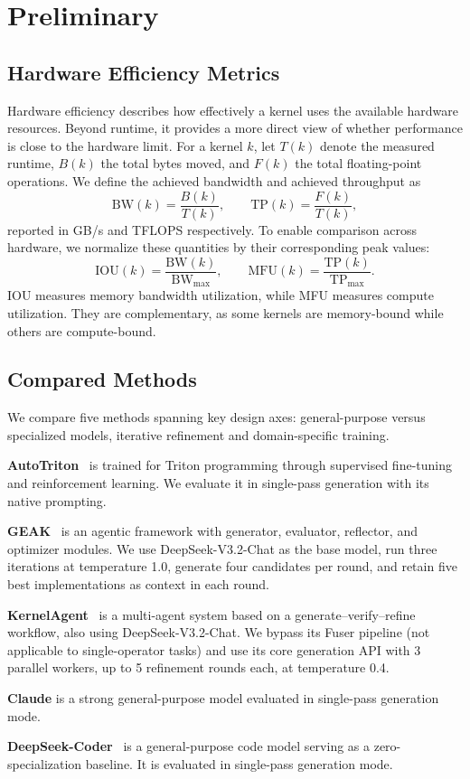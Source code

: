 \section{Preliminary}  
\label{Sec:Preliminary}

\subsection{Hardware Efficiency Metrics}

Hardware efficiency describes how effectively a kernel uses the available hardware resources. Beyond runtime, it provides a more direct view of whether performance is close to the hardware limit.
For a kernel $k$, let $T(k)$ denote the measured runtime, $B(k)$ the total bytes moved, and $F(k)$ the total floating-point operations. We define the achieved bandwidth and achieved throughput as
\begin{equation}
\mathrm{BW}(k)=\frac{B(k)}{T(k)}, \qquad
\mathrm{TP}(k)=\frac{F(k)}{T(k)},
\end{equation}
reported in GB/s and TFLOPS respectively.
To enable comparison across hardware, we normalize these quantities by their corresponding peak values:
\begin{equation}
\mathrm{IOU}(k)=\frac{\mathrm{BW}(k)}{\mathrm{BW}_{\max}}, \qquad
\mathrm{MFU}(k)=\frac{\mathrm{TP}(k)}{\mathrm{TP}_{\max}}.
\end{equation}
IOU measures memory bandwidth utilization, while MFU measures compute utilization. They are complementary, as some kernels are memory-bound while others are compute-bound.


\subsection{Compared Methods}

We compare five methods spanning key design axes: general-purpose versus specialized models, iterative refinement and domain-specific training.

\textbf{AutoTriton}~\cite{li2025autotriton} is trained for Triton programming through supervised fine-tuning and reinforcement learning. We evaluate it in single-pass generation with its native prompting.

\textbf{GEAK}~\cite{wang2025geak} is an agentic framework with generator, evaluator, reflector, and optimizer modules. We use DeepSeek-V3.2-Chat as the base model, run three iterations at temperature 1.0, generate four candidates per round, and retain five best implementations as context in each round.

\textbf{KernelAgent}~\cite{kernelagent2025} is a multi-agent system based on a generate–verify–refine workflow, also using DeepSeek-V3.2-Chat. We bypass its Fuser pipeline (not applicable to single-operator tasks) and use its core generation API with 3 parallel workers, up to 5 refinement rounds each, at temperature 0.4.

\textbf{Claude} is a strong general-purpose model evaluated in single-pass generation mode.

\textbf{DeepSeek-Coder}~\cite{liu2024deepseek} is a general-purpose code model serving as a zero-specialization baseline. It is evaluated in single-pass generation mode.